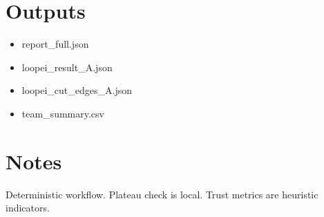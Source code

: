 \documentclass[10pt]{article}
\begin{document}
\section*{Outputs}

\begin{itemize}
\item report\_full.json
\item loopei\_result\_A.json
\item loopei\_cut\_edges\_A.json
\item team\_summary.csv
\end{itemize}

\section*{Notes}

Deterministic workflow. Plateau check is local. Trust metrics are heuristic indicators.
\end{document}
